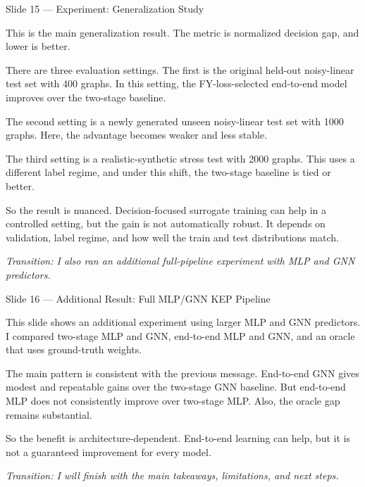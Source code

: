 \documentclass[11pt, aspectratio=169]{beamer}
\newcommand{\tr}[1]{\vspace{0.35em}\textit{\textcolor{black!55}{Transition: #1}}}
\newcommand{\timing}[1]{}
\begin{document}
\begin{frame}{Slide 15 \enspace\textmd{\small\textcolor{black!40}{--- Experiment: Generalization Study}}}
\footnotesize
\timing{1 minute 5 seconds}

This is the main generalization result. The metric is normalized decision gap,
and lower is better.

\vspace{0.35em}
There are three evaluation settings. The first is the original held-out
noisy-linear test set with 400 graphs. In this setting, the FY-loss-selected
end-to-end model improves over the two-stage baseline.

\vspace{0.35em}
The second setting is a newly generated unseen noisy-linear test set with 1000
graphs. Here, the advantage becomes weaker and less stable.

\vspace{0.35em}
The third setting is a realistic-synthetic stress test with 2000 graphs. This
uses a different label regime, and under this shift, the two-stage baseline is
tied or better.

\vspace{0.35em}
So the result is nuanced. Decision-focused surrogate training can help in a
controlled setting, but the gain is not automatically robust. It depends on
validation, label regime, and how well the train and test distributions match.

\tr{I also ran an additional full-pipeline experiment with MLP and GNN predictors.}
\end{frame}

\begin{frame}{Slide 16 \enspace\textmd{\small\textcolor{black!40}{--- Additional Result: Full MLP/GNN KEP Pipeline}}}
\small
\timing{35 seconds}

This slide shows an additional experiment using larger MLP and GNN predictors. I
compared two-stage MLP and GNN, end-to-end MLP and GNN, and an oracle that uses
ground-truth weights.

\vspace{0.35em}
The main pattern is consistent with the previous message. End-to-end GNN gives
modest and repeatable gains over the two-stage GNN baseline. But end-to-end MLP
does not consistently improve over two-stage MLP. Also, the oracle gap remains
substantial.

\vspace{0.35em}
So the benefit is architecture-dependent. End-to-end learning can help, but it is
not a guaranteed improvement for every model.

\tr{I will finish with the main takeaways, limitations, and next steps.}
\end{frame}
\end{document}
